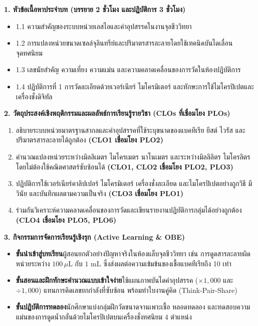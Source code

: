 \cleardoublepage
{}
\begin{planbox}
\noindent\textbf{1. หัวข้อเนื้อหาประจำบท (บรรยาย 2 ชั่วโมง และปฏิบัติการ 3 ชั่วโมง)}
\begin{itemize}
    \item 1.1 ความสำคัญของระบบหน่วยเอสไอและคำอุปสรรคในงานจุลชีววิทยา
    \item 1.2 การแปลงหน่วยขนาดเซลล์จุลินทรีย์และปริมาตรสารละลายโดยใช้เทคนิคบันไดเลื่อนจุดทศนิยม
    \item 1.3 เลขนัยสำคัญ ความเที่ยง ความแม่น และความคลาดเคลื่อนของการวัดในห้องปฏิบัติการ
    \item 1.4 ปฏิบัติการที่ 1 การวัดละเอียดด้วยเวอร์เนียร์ ไมโครมิเตอร์ และทักษะการใช้ไมโครปิเปตและเครื่องชั่งดิจิทัล
\end{itemize}

\noindent\textbf{2. วัตถุประสงค์เชิงพฤติกรรมและผลลัพธ์การเรียนรู้รายวิชา (CLOs ที่เชื่อมโยง PLOs)}
\begin{enumerate}
    \item อธิบายระบบหน่วยมาตรฐานสากลและคำอุปสรรคที่ใช้ระบุขนาดของแบคทีเรีย ยีสต์ ไวรัส และปริมาตรสารละลายได้ถูกต้อง \textbf{(CLO1 เชื่อมโยง PLO2)}
    \item คำนวณแปลงหน่วยระหว่างมิลลิเมตร ไมโครเมตร นาโนเมตร และระหว่างมิลลิลิตร ไมโครลิตร โดยไม่ต้องใช้คณิตศาสตร์ซับซ้อนได้ \textbf{(CLO1, CLO2 เชื่อมโยง PLO2, PLO3)}
    \item ปฏิบัติการใช้เวอร์เนียร์คาลิปเปอร์ ไมโครมิเตอร์ เครื่องชั่งละเอียด และไมโครปิเปตอย่างถูกวิธี มีวินัย และบันทึกผลตามความเป็นจริง \textbf{(CLO3 เชื่อมโยง PLO1)}
    \item ร่วมกันวิเคราะห์ความคลาดเคลื่อนของการวัดและเขียนรายงานปฏิบัติการกลุ่มได้อย่างถูกต้อง \textbf{(CLO4 เชื่อมโยง PLO5, PLO6)}
\end{enumerate}

\noindent\textbf{3. กิจกรรมการจัดการเรียนรู้เชิงรุก (Active Learning \& OBE)}
\begin{itemize}
    \item \textbf{ขั้นนำเข้าสู่บทเรียน}\quad ผู้สอนยกตัวอย่างปัญหาจริงในห้องแล็บจุลชีววิทยา เช่น การดูดสารละลายผิดหน่วยระหว่าง $100\,\mu\text{L}$ กับ $1\text{ mL}$ ซึ่งส่งผลต่อความเข้มข้นของเชื้อแบคทีเรียถึง 10 เท่า
    \item \textbf{ขั้นสอนและฝึกทักษะคำนวณแบบเข้าใจง่าย}\quad ใช้แผนภาพบันไดคำอุปสรรค ($\times 1{,}000$ และ $\div 1{,}000$) แทนการคิดเลขยกกำลังที่ซับซ้อน พร้อมทำใบงานคู่คิด (Think-Pair-Share)
    \item \textbf{ขั้นปฏิบัติการทดลอง}\quad นักศึกษาแบ่งกลุ่มฝึกวัดขนาดจานเพาะเชื้อ หลอดทดลอง และทดสอบความแม่นของการดูดน้ำกลั่นด้วยไมโครปิเปตบนเครื่องชั่งทศนิยม 4 ตำแหน่ง
\end{itemize}


\end{planbox}
